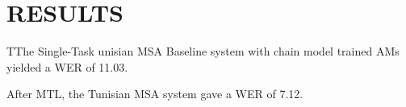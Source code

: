 \documentclass[11pt]{article}
\begin{document}
  \section{RESULTS}
\label{sec-5}

TThe Single-Task unisian \gls{MSA} Baseline system with chain model trained \gls{AM}s yielded a \gls{WER} of 11.03. %

After MTL, the Tunisian \gls{MSA} system gave a \gls{WER} of 7.12. %




\printglossaries

\end{document}
